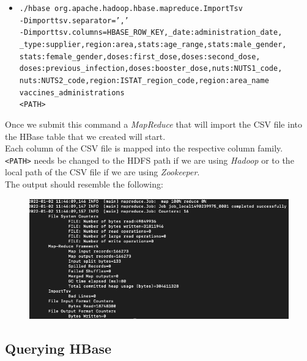 \documentclass[12pt, a4paper]{article}
\begin{document}
\begin{footnotesize}
  \begin{itemize}
    \item[] \texttt{./hbase org.apache.hadoop.hbase.mapreduce.ImportTsv \\
      -Dimporttsv.separator=',' \\
      -Dimporttsv.columns=HBASE\_ROW\_KEY,\_date:administration\_date, \\
        \_type:supplier,region:area,stats:age\_range,stats:male\_gender, \\
        stats:female\_gender,doses:first\_dose,doses:second\_dose, \\
        doses:previous\_infection,doses:booster\_dose,nuts:NUTS1\_code, \\
        nuts:NUTS2\_code,region:ISTAT\_region\_code,region:area\_name \\
      vaccines\_administrations \\
      <PATH>} 
  \end{itemize}
\end{footnotesize}
Once we submit this command a \emph{MapReduce} that will import the CSV file into the 
HBase table that we created will start. \\
Each column of the CSV file is mapped into the respective column family.  \\
\texttt{<PATH>} needs be changed to the HDFS path if we are using \emph{Hadoop} or to 
the local path of the CSV file if we are using \emph{Zookeeper}. \\
The output should resemble the following: 

\begin{figure}[ht]
  \centering
  \includegraphics[width=\linewidth]{hbase_import.png}
\end{figure}

\subsection{Querying HBase}
\end{document}
